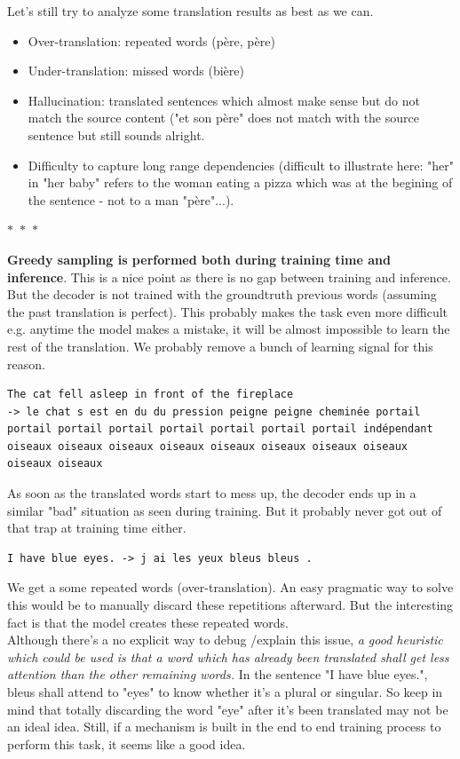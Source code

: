 \documentclass[a4paper]{article}
\begin{document}
Let's still try to analyze some translation results as best as we can.
\begin{itemize}
\item Over-translation: repeated words (père, père)
\item Under-translation: missed words (bière)
\item Hallucination: translated sentences which almost make sense but do not match the source content ("et son père" does not match with the source sentence but still sounds alright.
\item Difficulty to capture long range dependencies (difficult to illustrate here: "her" in "her baby" refers to the woman eating a pizza which was at the begining of the sentence - not to a man "père"...).
\end{itemize}


\begin{center}
  $\ast$~$\ast$~$\ast$
\end{center}


\textbf{Greedy sampling is performed both during training time and inference}. This is a nice point as there is no gap between training and inference. But the decoder is not trained with the groundtruth previous words (assuming the past translation is perfect). This probably makes the task even more difficult e.g. anytime the model makes a mistake, it will be almost impossible to learn the rest of the translation. We probably remove a bunch of learning signal for this reason.

\begin{verbatim}
The cat fell asleep in front of the fireplace 
-> le chat s est en du du pression peigne peigne cheminée portail
portail portail portail portail portail portail portail indépendant
oiseaux oiseaux oiseaux oiseaux oiseaux oiseaux oiseaux oiseaux
oiseaux oiseaux
\end{verbatim}
As soon as the translated words start to mess up, the decoder ends up in a similar "bad" situation as seen during training. But it probably never got out of that trap at training time either.


\begin{verbatim}
I have blue eyes. -> j ai les yeux bleus bleus .
\end{verbatim}

We get a some repeated words (over-translation). An easy pragmatic way to solve this would be to manually discard these repetitions afterward. But the interesting fact is that the model creates these repeated words.\\
Although there's a no explicit way to debug /explain this issue, \textit{a good heuristic which could be used is that a word which has already been translated shall get less attention than the other remaining words.}
In the sentence "I have blue eyes.", bleus shall attend to "eyes" to know whether it's a plural or singular. So keep in mind that totally discarding the word "eye" after it's been translated may not be an ideal idea. Still, if a mechanism is built in the end to end training process to perform this task, it seems like a good idea.\\
\end{document}
